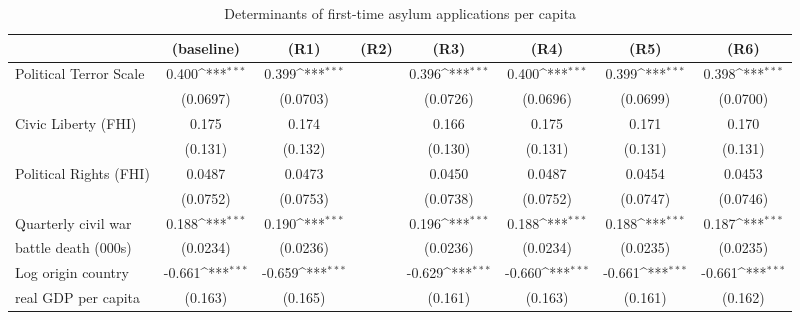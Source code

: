 \begin{table}[htbp]\centering
	\scriptsize
	\def\sym#1{\ifmmode^{#1}\else\(^{#1}\)\fi}
	\caption{Determinants of first-time asylum applications per capita}
	\begin{tabular}{l*{7}{c}}
		\hline\hline
		&\multicolumn{1}{c}{(baseline)}     &\multicolumn{1}{c}{(R1)}       &\multicolumn{1}{c}{(R2)}       &\multicolumn{1}{c}{(R3)}    	&\multicolumn{1}{c}{(R4)}  	&\multicolumn{1}{c}{(R5)}   &\multicolumn{1}{c}{(R6)}         	\\
\hline
Political Terror Scale&       0.400\sym{***}&       0.399\sym{***}&                     &       0.396\sym{***}&       0.400\sym{***}&       0.399\sym{***}&       0.398\sym{***}\\
                    &    (0.0697)         &    (0.0703)         &                     &    (0.0726)         &    (0.0696)         &    (0.0699)         &    (0.0700)         \\
[0,5em]
Civic Liberty (FHI) &       0.175         &       0.174         &                     &       0.166         &       0.175         &       0.171         &       0.170         \\
                    &     (0.131)         &     (0.132)         &                     &     (0.130)         &     (0.131)         &     (0.131)         &     (0.131)         \\
[0,5em]
Political Rights (FHI)&      0.0487         &      0.0473         &                     &      0.0450         &      0.0487         &      0.0454         &      0.0453         \\
                    &    (0.0752)         &    (0.0753)         &                     &    (0.0738)         &    (0.0752)         &    (0.0747)         &    (0.0746)         \\
[0,5em]
Quarterly civil war&       0.188\sym{***}&       0.190\sym{***}&                     &       0.196\sym{***}&       0.188\sym{***}&       0.188\sym{***}&       0.187\sym{***}\\
 battle death (000s)                    &    (0.0234)         &    (0.0236)         &                     &    (0.0236)         &    (0.0234)         &    (0.0235)         &    (0.0235)         \\
[0,5em]
Log origin country &      -0.661\sym{***}&      -0.659\sym{***}&                     &      -0.629\sym{***}&      -0.660\sym{***}&      -0.661\sym{***}&      -0.661\sym{***}\\
real GDP per capita                    &     (0.163)         &     (0.165)         &                     &     (0.161)         &     (0.163)         &     (0.161)         &     (0.162)         \\

\end{tabular}
\end{table}
